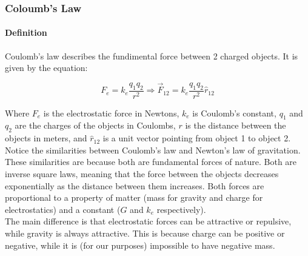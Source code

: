 \subsubsection*{Coloumb's Law}

\paragraph*{Definition}
Coulomb's law describes the fundimental force between 2 charged objects. It is given by the equation:

\begin{equation*}
    F_e = k_e \frac{q_1q_2}{r^2} \Longrightarrow \vec{F}_{12} = k_e \frac{q_1q_2}{r^2}\hat{r}_{12}
\end{equation*}

Where $F_e$ is the electrostatic force in Newtons, $k_e$ is Coulomb's constant, $q_1$ and $q_2$ are the charges of the objects in Coulombs,
$r$ is the distance between the objects in meters, and $\hat{r}_{12}$ is a unit vector pointing from object 1 to object 2.\\

Notice the similarities between Coulomb's law and Newton's law of gravitation. These similarities are because both are fundamental forces of nature.
Both are inverse square laws, meaning that the force between the objects decreases exponentially as the distance between them increases. Both forces are
proportional to a property of matter (mass for gravity and charge for electrostatics) and a constant ($G$ and $k_e$ respectively).\\

The main difference is that electrostatic forces can be attractive or repulsive, while gravity is always attractive. This is because charge can be positive
or negative, while it is (for our purposes) impossible to have negative mass.\\

